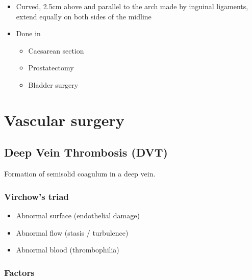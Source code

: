 \documentclass[
  14pt,
]{memoir}
\providecommand{\tightlist}{%
  \setlength{\itemsep}{0pt}\setlength{\parskip}{0pt}}
\begin{document}
\begin{itemize}
\tightlist
\item
  Curved, 2.5cm above and parallel to the arch made by inguinal
  ligaments, extend equally on both sides of the midline
\item
  Done in

  \begin{itemize}
  \tightlist
  \item
    Caesarean section
  \item
    Prostatectomy
  \item
    Bladder surgery
  \end{itemize}
\end{itemize}

\pagebreak

\hypertarget{vascular-surgery}{%
\chapter{Vascular surgery}\label{vascular-surgery}}

\hypertarget{deep-vein-thrombosis-dvt}{%
\section{Deep Vein Thrombosis (DVT)}\label{deep-vein-thrombosis-dvt}}

Formation of semisolid coagulum in a deep vein.

\hypertarget{virchows-triad}{%
\subsection{Virchow's triad}\label{virchows-triad}}

\begin{itemize}
\tightlist
\item
  Abnormal surface (endothelial damage)
\item
  Abnormal flow (stasis / turbulence)
\item
  Abnormal blood (thrombophilia)
\end{itemize}

\hypertarget{factors}{%
\subsection{Factors}\label{factors}}
\end{document}
